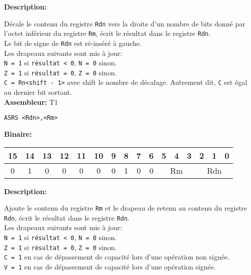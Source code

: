 \documentclass{article}
\begin{document}

    \textbf{Description: }

    Décale le contenu du registre \texttt{Rdn} vers la droite d'un nombre de bits donné par l'octet inférieur du registre \texttt{Rm}, écrit le résultat dans le registre \texttt{Rdn}.\\
    Le bit de signe de \texttt{Rdn} est ré-inséré à gauche.\\
    Les drapeaux suivants sont mis à jour:\\
    \texttt{N = 1} si \texttt{résultat < 0}, \texttt{N = 0} sinon.\\
    \texttt{Z = 1} si \texttt{résultat = 0}, \texttt{Z = 0} sinon.\\
    \texttt{C = Rn<shift - 1>} avec shift le nombre de décalage.
    Autrement dit, \texttt{C} est égal au dernier bit sortant.\\

    \textbf{Assembleur:} T1

    \begin{lstlisting}
ASRS <Rdn>,<Rm>
    \end{lstlisting}

    \textbf{Binaire:}\\

    \begin{tabular}{| c c c c c c c c c c c c c c c c |}
        \hline
        15 & 14 & 13 & 12 & 11 & 10 & \multicolumn{1}{|c}{9} & 8 & 7 & 6 & \multicolumn{1}{|c}{5} & 4 & 3 & \multicolumn{1}{|c}{2} & 1 & 0 \\
        \hline
        0 & 1 & 0 & 0 & 0 & 0 & \multicolumn{1}{|c}{0} & 1 & 0 & 0 & \multicolumn{3}{|c}{Rm} & \multicolumn{3}{|c|}{Rdn} \\
        \hline
    \end{tabular}



    \textbf{Description: }

    Ajoute le contenu du registre \texttt{Rm} et le drapeau de retenu au contenu du registre \texttt{Rdn}, écrit le résultat dans le registre \texttt{Rdn}.\\
    Les drapeaux suivants sont mis à jour:\\
    \texttt{N = 1} si \texttt{résultat < 0}, \texttt{N = 0} sinon.\\
    \texttt{Z = 1} si \texttt{résultat = 0}, \texttt{Z = 0} sinon.\\
    \texttt{C = 1} en cas de dépassement de capacité lors d'une opération non signée.\\
    \texttt{V = 1} en cas de dépassement de capacité lors d'une opération signée.\\
\end{document}
